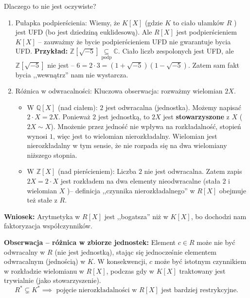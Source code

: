 \noindent Dlaczego to nie jest oczywiste?\\
\begin{enumerate}[label=\arabic*.]
	\item Pułapka podpierścienia: Wiemy, że $K\left[ X \right] $ (gdzie $K$ to ciało ułamków $R$ ) jest UFD (bo jest dziedziną euklidesową). Ale $R\left[ X \right] $ jest podpierścieniem $K\left[ X \right] $ -- zauważmy że bycie podpierścieniem UFD nie gwarantuje bycia UFD.
	\noindent \textbf{Przykład:} $\mathbb{Z}\left[ \sqrt{-5}  \right] \underset{\scriptscriptstyle\text{podp}}{\subseteq} \mathbb{C}$. Ciało liczb zespolonych jest UFD, ale $\mathbb{Z}\left[ \sqrt{-5}  \right] $ nie jest -- $6 = 2\cdot 3 = \left( 1+\sqrt{-5}  \right)\left( 1-\sqrt{-5}  \right) $. Zatem sam fakt bycia ,,wewnątrz'' nam nie wystarcza.
	\item Różnica w odwracalności: Kluczowa obserwacja: rozważmy wielomian $2X$.
		 \begin{itemize}
			\item W $\mathbb{Q}\left[ X \right] $ (nad ciałem): $2$ jest odwracalna (jednostka). Możemy napisać $2 \cdot X = 2X$. Ponieważ $2$ jest jednostką, to $2X$ jest \textbf{stowarzyszone} z $X$ ($2X \sim X$). Mnożenie przez jedność nie wpływa na rozkładalność, stopień wynosi $1$, więc jest to wielomian nierozkładalny. Wielomian jest nierozkładalny w tym sensie, że nie rozpada się na dwa wielomiany niższego stopnia.
			\item W $\mathbb{Z}\left[ X \right]$ (nad pierścieniem): Liczba $2$ nie jest odwracalna. Zatem zapis  $2X = 2 \cdot X$ jest rozkładem na dwa elementy nieodwracalne (stała $2$ i wielomian $X$ )-- definicja ,,czynnika nierozkładalnego'' w $R\left[ X \right] $ obejmuje też stałe z $R$.
		\end{itemize}
\end{enumerate}
\noindent \textbf{Wniosek:} Arytmetyka w $R\left[ X \right] $ jest ,,bogatsza'' niż w $K\left[ X \right] $, bo dochodzi nam faktoryzacja współczynników. 


 \noindent \textbf{Obserwacja -- różnica w zbiorze jednostek:} Element $c \in R$ może nie być odwracalny w $R$ (nie jest jednostką), stając się jednocześnie elementem odwracalnym (jednością) w  $K$. W konsekwencji,  $c$ może być istotnym czynnikiem w rozkładzie wielomianu w $R\left[ X \right] $, podczas gdy w $K\left[ X \right] $ traktowany jest trywialnie (jako stowarzyszenie).
 \[
  R^{\ast} \subsetneq K^{\ast} \implies \text{ pojęcie nierozkładalności w } R\left[ X \right] \text{ jest bardziej restrykcyjne}
 .\] 

